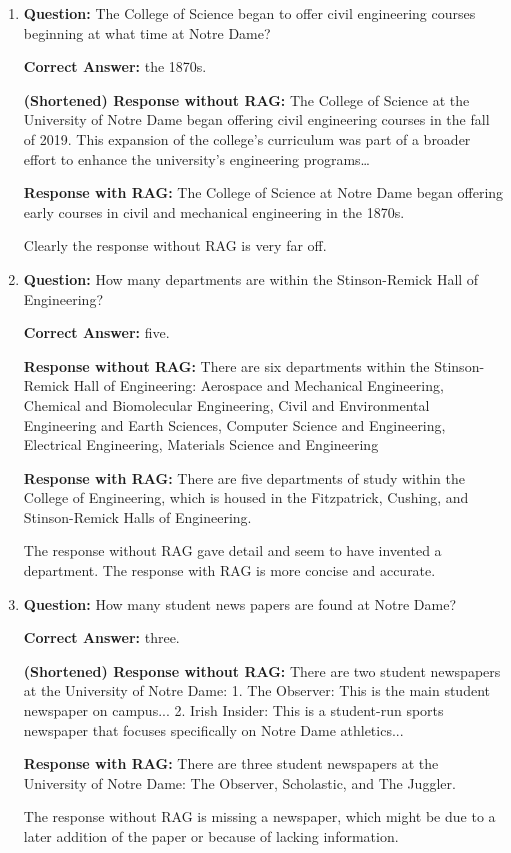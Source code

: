 \documentclass[12pt]{article}
\begin{document}
\begin{enumerate}
    \item \textbf{Question:} The College of Science began to offer civil engineering courses beginning at what time at Notre Dame?
    
    \textbf{Correct Answer:} the 1870s.
    
    \textbf{(Shortened) Response without RAG:} The College of Science at the University of Notre Dame began offering civil engineering courses in the fall of 2019. This expansion of the college's curriculum was part of a broader effort to enhance the university's engineering programs\dots

    \textbf{Response with RAG:} The College of Science at Notre Dame began offering early courses in civil and mechanical engineering in the 1870s.
    
    Clearly the response without RAG is very far off.

    \item \textbf{Question:} How many departments are within the Stinson-Remick Hall of Engineering?
    
    \textbf{Correct Answer:} five.

    \textbf{Response without RAG:} There are six departments within the Stinson-Remick Hall of Engineering: 
    Aerospace and Mechanical Engineering,
    Chemical and Biomolecular Engineering,
    Civil and Environmental Engineering and Earth Sciences,
    Computer Science and Engineering,
    Electrical Engineering,
    Materials Science and Engineering 

    \textbf{Response with RAG:} There are five departments of study within the College of Engineering, which is housed in the Fitzpatrick, Cushing, and Stinson-Remick Halls of Engineering.

    The response without RAG gave detail and seem to have invented a department. The response with RAG is more concise and accurate.

    \item \textbf{Question:} How many student news papers are found at Notre Dame?
    
    \textbf{Correct Answer:} three.
    
    \textbf{(Shortened) Response without RAG:} There are two student newspapers at the University of Notre Dame: 
    1. The Observer: This is the main student newspaper on campus...
    2. Irish Insider: This is a student-run sports newspaper that focuses specifically on Notre Dame athletics...

    \textbf{Response with RAG:} There are three student newspapers at the University of Notre Dame: The Observer, Scholastic, and The Juggler.  

    The response without RAG is missing a newspaper, which might be due to a later addition of the paper or because of lacking information. 
\end{enumerate}
\end{document}
